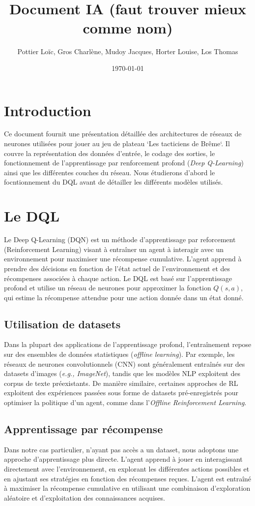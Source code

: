 \documentclass[]{article}
\title{\textbf{Document IA (faut trouver mieux comme nom)}} %
\author{Pottier Loïc, Gros Charlène, Mudoy Jacques, Horter Louise, Los Thomas}
\date{\today}
\begin{document}
\maketitle


\section{Introduction}
Ce document fournit une présentation détaillée des architectures de réseaux de neurones utilisées pour jouer au jeu de plateau `Les tacticiens de Brême`. Il couvre la représentation des données d'entrée, le codage des sorties, le fonctionnement de l'apprentissage par renforcement profond (\textit{Deep Q-Learning}) ainsi que les différentes couches du réseau.
Nous étudierons d'abord le focntionnement du DQL avant de détailler les différents modèles utilisés.

\section{Le DQL}
Le Deep Q-Learning (DQN) est un méthode d'apprentissage par reforcement (Reinforcement Learning) visant à entraîner un agent à interagir avec un environnement pour maximiser une récompense cumulative. L'agent apprend à prendre des décisions en fonction de l'état actuel de l'environnement et des récompenses associées à chaque action. Le DQL est basé sur l'apprentissage profond et utilise un réseau de neurones pour approximer la fonction \(Q(s, a)\), qui estime la récompense attendue pour une action donnée dans un état donné.

\subsection{Utilisation de datasets}
Dans la plupart des applications de l'apprentissage profond, l'entraînement repose sur des ensembles de données statistiques (\textit{offline learning}). Par exemple, les réseaux de neurones convolutionnels (CNN) sont généralement entraînés sur des datasets d'images (\textit{e.g., ImageNet}), tandis que les modèles NLP exploitent des corpus de texte préexistants. De manière similaire, certaines approches de RL exploitent des expériences passées sous forme de datasets pré-enregistrés pour optimiser la politique d'un agent, comme dans l'\textit{Offline Reinforcement Learning}.

\subsection{Apprentissage par récompense}
Dans notre cas particulier, n'ayant pas accès a un dataset, nous adoptons une approche d'apprentissage plus directe. L'agent apprend à jouer en interagissant directement avec l'environnement, en explorant les différentes actions possibles et en ajustant ses stratégies en fonction des récompenses reçues. L'agent est entraîné à maximiser la récompense cumulative en utilisant une combinaison d'exploration aléatoire et d'exploitation des connaissances acquises.
\end{document}
